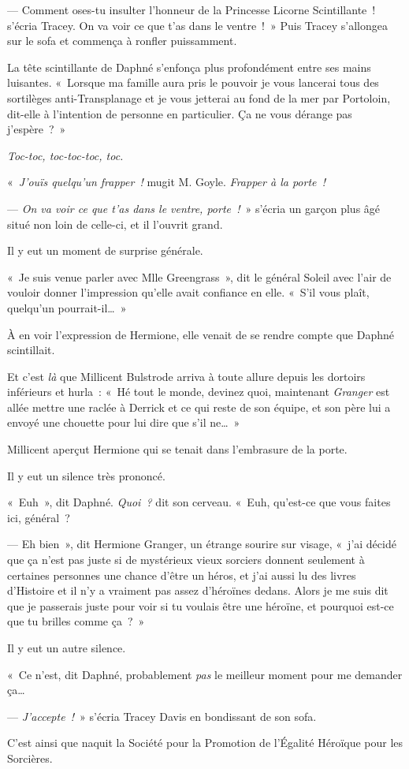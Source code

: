 --- Comment oses-tu insulter l'honneur de la Princesse Licorne Scintillante~! s'écria Tracey. On va voir ce que t'as dans le ventre~!~» Puis Tracey s'allongea sur le sofa et commença à ronfler puissamment.

La tête scintillante de Daphné s'enfonça plus profondément entre ses mains luisantes. «~Lorsque ma famille aura pris le pouvoir je vous lancerai tous des sortilèges anti-Transplanage et je vous jetterai au fond de la mer par Portoloin, dit-elle à l'intention de personne en particulier. Ça ne vous dérange pas j'espère~?~»

\emph{Toc-toc, toc-toc-toc, toc.}

«~\emph{J'ouïs quelqu'un frapper~!} mugit M. Goyle. \emph{Frapper à la porte~!}

--- \emph{On va voir ce que t'as dans le ventre, porte~!}~» s'écria un garçon plus âgé situé non loin de celle-ci, et il l'ouvrit grand.

Il y eut un moment de surprise générale.

«~Je suis venue parler avec Mlle Greengrass~», dit le général Soleil avec l'air de vouloir donner l'impression qu'elle avait confiance en elle. «~S'il vous plaît, quelqu'un pourrait-il…~»

À en voir l'expression de Hermione, elle venait de se rendre compte que Daphné scintillait.

Et c'est \emph{là} que Millicent Bulstrode arriva à toute allure depuis les dortoirs inférieurs et hurla~: «~Hé tout le monde, devinez quoi, maintenant \emph{Granger} est allée mettre une raclée à Derrick et ce qui reste de son équipe, et son père lui a envoyé une chouette pour lui dire que s'il ne…~»

Millicent aperçut Hermione qui se tenait dans l'embrasure de la porte.

Il y eut un silence très prononcé.

«~Euh~», dit Daphné. \emph{Quoi~?} dit son cerveau. «~Euh, qu'est-ce que vous faites ici, général~?

--- Eh bien~», dit Hermione Granger, un étrange sourire sur visage, «~j'ai décidé que ça n'est pas juste si de mystérieux vieux sorciers donnent seulement à certaines personnes une chance d'être un héros, et j'ai aussi lu des livres d'Histoire et il n'y a vraiment pas assez d'héroïnes dedans. Alors je me suis dit que je passerais juste pour voir si tu voulais être une héroïne, et pourquoi est-ce que tu brilles comme ça~?~»

Il y eut un autre silence.

«~Ce n'est, dit Daphné, probablement \emph{pas} le meilleur moment pour me demander ça…

--- \emph{J'accepte~!}~» s'écria Tracey Davis en bondissant de son sofa.

\later

C'est ainsi que naquit la Société pour la Promotion de l'Égalité Héroïque pour les Sorcières.
